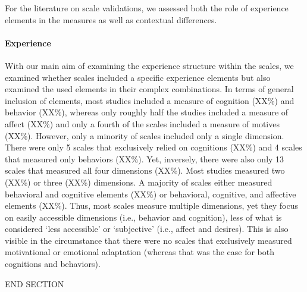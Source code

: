 For the literature on scale validations, we assessed both the role of
experience elements in the measures as well as contextual differences.

\paragraph{Experience}

With our main aim of examining the experience structure within the
scales, we examined whether scales included a specific experience
elements but also examined the used elements in their complex
combinations. In terms of general inclusion of elements, most studies
included a measure of cognition (XX\%) and behavior (XX\%), whereas only
roughly half the studies included a measure of affect (XX\%) and only a
fourth of the scales included a measure of motives (XX\%). However, only
a minority of scales included only a single dimension. There were only 5
scales that exclusively relied on cognitions (XX\%) and 4 scales that
measured only behaviors (XX\%). Yet, inversely, there were also only 13
scales that measured all four dimensions (XX\%). Most studies measured
two (XX\%) or three (XX\%) dimensions. A majority of scales either
measured behavioral and cognitive elements (XX\%) or behavioral,
cognitive, and affective elements (XX\%). Thus, most scales measure
multiple dimensions, yet they focus on easily accessible dimensions
(i.e., behavior and cognition), less of what is considered `less
accessible' or `subjective' (i.e., affect and desires). This is also
visible in the circumstance that there were no scales that exclusively
measured motivational or emotional adaptation (whereas that was the case
for both cognitions and behaviors).

END SECTION
